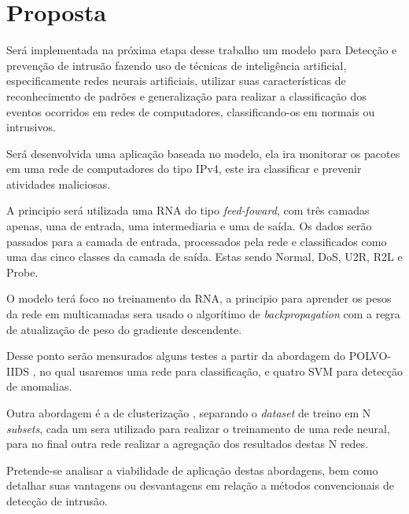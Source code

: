
\chapter[Proposta]{Proposta}

Será implementada na próxima etapa desse trabalho um modelo para Detecção e prevenção de intrusão fazendo uso de técnicas de inteligência artificial, especificamente redes neurais artificiais, utilizar suas características de reconhecimento de padrões e generalização para realizar a classificação dos eventos ocorridos em redes de computadores, classificando-os em normais ou intrusivos.

Será desenvolvida uma aplicação baseada no modelo, ela ira monitorar os pacotes em uma rede de computadores do tipo IPv4, este ira classificar e prevenir atividades maliciosas.

A principio será utilizada uma RNA do tipo \textit{feed-foward}, com três camadas apenas, uma de entrada, uma intermediaria e uma de saída. Os dados serão passados para a camada de entrada, processados pela rede e classificados como uma das cinco classes da camada de saída. Estas sendo Normal, DoS, U2R, R2L e Probe.  

O modelo terá foco no treinamento da RNA, a principio para aprender os pesos da rede em multicamadas sera usado o algorítimo de \textit{backpropagation} com a regra de atualização de peso do gradiente descendente.

Desse ponto serão mensurados alguns testes a partir da abordagem do POLVO-IIDS \cite{polvo1}, no qual usaremos uma rede para classificação, e quatro SVM para detecção de anomalias.

Outra abordagem é a de clusterização \cite{Surana}, separando o \textit{dataset} de treino em N \textit{subsets}, cada um sera utilizado para realizar o treinamento de uma rede neural, para no final outra rede  realizar a agregação dos resultados destas N redes.

 
Pretende-se analisar a viabilidade de aplicação destas abordagens, bem como
detalhar suas vantagens ou desvantagens em relação a métodos convencionais de
detecção de intrusão.
